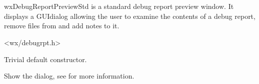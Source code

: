 
\section{}\label{wxdebugreportpreviewstd}

wxDebugReportPreviewStd is a standard debug report preview window. It displays
a GUIdialog allowing the user to examine the contents of a debug report, remove
files from and add notes to it.





<wx/debugrpt.h>





\label{wxdebugreportpreviewstdwxdebugreportpreviewstd}


Trivial default constructor.


\label{wxdebugreportpreviewstdshow}


Show the dialog, see 
 for more
information.

